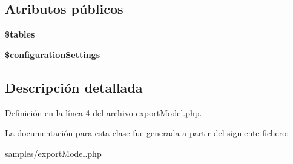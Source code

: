 \subsection*{\-Atributos públicos}
\begin{DoxyCompactItemize}
\item 
\hypertarget{classexport_ad82d75c031cf67d8890ffc9c9695948d}{{\bfseries \$tables}}\label{classexport_ad82d75c031cf67d8890ffc9c9695948d}

\item 
\hypertarget{classexport_a78444bac26d987c08fcdc31ef7b0088f}{{\bfseries \$configuration\-Settings}}\label{classexport_a78444bac26d987c08fcdc31ef7b0088f}

\end{DoxyCompactItemize}


\subsection{\-Descripción detallada}


\-Definición en la línea 4 del archivo export\-Model.\-php.



\-La documentación para esta clase fue generada a partir del siguiente fichero\-:\begin{DoxyCompactItemize}
\item 
samples/export\-Model.\-php\end{DoxyCompactItemize}
